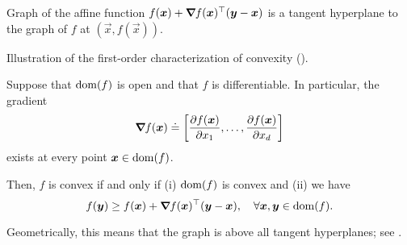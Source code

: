 \begin{marginfigure}[-6cm]
    \centering
    \caption{Graph of the affine function $f(\bm{x}) + \bm{\nabla}_{\! } f(\bm{x})^\top(\bm{y}-\bm{x})$ is a tangent hyperplane to the graph of $f$ at $(\vec{x},f(\vec{x}))$.}
    \label{fig:differentiable-function}
\end{marginfigure}

\begin{marginfigure}
    \centering
    \caption{Illustration of the first-order characterization of convexity ().}
    \label{fig:first-order-convexity}
\end{marginfigure}

\begin{lemma} \label{lem:first-order-convexity}
    Suppose that $\mathrm{dom}(f)$ is open and that $f$ is differentiable. In particular, the gradient \[
        \grad{f(\vec{x})}{} \doteq \lft[ \pdv{f(\vec{x})}{x_1}, \ldots, \pdv{f(\vec{x})}{x_d} \rgt]
    \]
    exists at every point $\bm{x}\in\mathrm{dom}(f)$.

    Then, $f$ is convex if and only if (i) $\mathrm{dom}(f)$ is convex and (ii) we have \[
        f(\bm{y}) \geq f(\bm{x}) + \bm{\nabla}_{\! } f(\bm{x})^\top (\bm{y}-\bm{x}), \quad \forall \bm{x}, \bm{y} \in \mathrm{dom}(f).
    \]
\end{lemma}

Geometrically, this means that the graph is above all tangent hyperplanes; see
.

